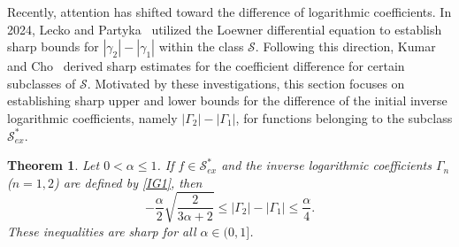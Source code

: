 \documentclass[10pt,a4paper]{amsart}
\newtheorem{theo}{Theorem}[section]
\numberwithin{equation}{section}
\begin{document}
Recently, attention has shifted toward the difference of logarithmic coefficients. In 2024, Lecko and Partyka~\cite{Lecko2023} utilized the Loewner differential equation to establish sharp bounds for $|\gamma_2| - |\gamma_1|$ within the class $\mathcal{S}$. Following this direction, Kumar and Cho~\cite{Kumar2023} derived sharp estimates for the coefficient difference for certain subclasses of $\mathcal{S}$. Motivated by these investigations, this section focuses on establishing sharp upper and lower bounds for the difference of the initial inverse logarithmic coefficients, namely $|\Gamma_2| - |\Gamma_1|$, for functions belonging to the subclass $\mathcal{S}_{ex}^{\ast}$.

\begin{theo}\label{T2}
Let $0 < \alpha \le 1$. If $f \in \mathcal{S}_{ex}^{\ast}$ and the inverse logarithmic coefficients $\Gamma_n$ ($n = 1,2$) are defined by \eqref{IG1}, then
\begin{equation}\label{ND15}
-\frac{\alpha}{2}\sqrt{\frac{2}{3\alpha + 2}} \le |\Gamma_2|-|\Gamma_1| \le \frac{\alpha}{4}.
\end{equation}
These inequalities are sharp for all $\alpha \in (0,1]$.
\end{theo}
\end{document}

